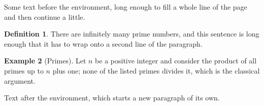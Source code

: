 \documentclass{article}
\theoremstyle{definition}
\newtheorem{definition}{Definition}
\newtheorem{example}[definition]{Example}
\begin{document}
Some text before the environment, long enough to fill a whole line of the page and then continue a little.
\begin{definition}
There are infinitely many prime numbers, and this sentence is long enough that it has to wrap onto a second line of the paragraph.
\end{definition}
\begin{example}[Primes]
Let $n$ be a positive integer and consider the product of all primes up to $n$ plus one; none of the listed primes divides it, which is the classical argument.
\end{example}
Text after the environment, which starts a new paragraph of its own.
\end{document}
